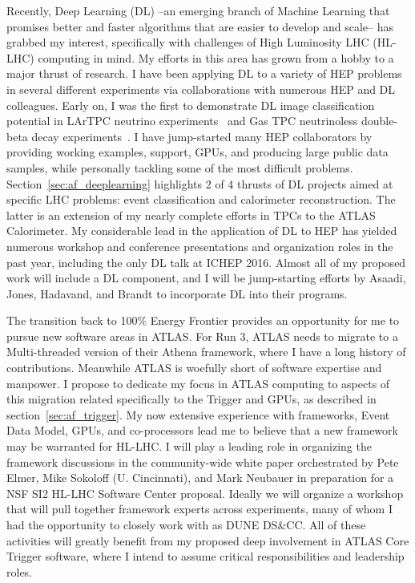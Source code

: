 Recently, Deep Learning (DL) --an emerging branch of Machine Learning
that promises better and faster algorithms that are easier to develop
and scale-- has grabbed my interest, specifically with challenges of
High Luminosity LHC (HL-LHC) computing in mind. My efforts in this
area has grown from a hobby to a major thrust of research. I have been
applying DL to a variety of HEP problems in several different
experiments via collaborations with numerous HEP and DL
colleagues. Early on, I was the first to demonstrate DL image
classification potential in LArTPC neutrino
experiments~\cite{AFFermilabSeminar} and Gas TPC neutrinoless
double-beta decay experiments~\cite{ICHEP2016DL}. I have jump-started
many HEP collaborators by providing working examples, support, GPUs,
and producing large public data samples, while personally tackling
some of the most difficult problems. Section~\ref{sec:af_deeplearning}
highlights 2 of 4 thrusts of DL projects aimed at specific LHC
problems: event classification and calorimeter reconstruction. The
latter is an extension of my nearly complete efforts in TPCs to the
ATLAS Calorimeter.  My considerable lead in the application of DL to
HEP has yielded numerous workshop and conference presentations and
organization roles in the past year\cite{DSAtLHC,WireCellWS,AFFermilabSeminar,
HeavyFlavorDL, ConnectingDotsDL,ATLASMLDL, HSFDL, SimonsDL, HarvardDL},
including the only DL talk at ICHEP 2016\cite{ICHEP2016DL}.  Almost
all of my proposed work will include a DL component, and I will be
jump-starting efforts by Asaadi, Jones, Hadavand, and Brandt to
incorporate DL into their programs.


The transition back to 100\% Energy Frontier provides an opportunity
for me to pursue new software areas in ATLAS. For Run 3, ATLAS needs
to migrate to a Multi-threaded version of their Athena framework,
where I have a long history of contributions. Meanwhile ATLAS is
woefully short of software expertise and manpower. I propose to
dedicate my focus in ATLAS computing to aspects of this migration
related specifically to the Trigger and GPUs, as described in
section~\ref{sec:af_trigger}. My now extensive experience with
frameworks, Event Data Model, GPUs, and co-processors lead me to
believe that a new framework may be warranted for HL-LHC.  I will play
a leading role in organizing the framework discussions in the
community-wide white paper orchestrated by Pete Elmer, Mike Sokoloff
(U. Cincinnati), and Mark Neubauer in preparation for a NSF SI2
HL-LHC Software Center proposal. Ideally we will organize a workshop
that will pull together framework experts across experiments, many of
whom I had the opportunity to closely work with as DUNE DS\&CC. All of
these activities will greatly benefit from my proposed deep
involvement in ATLAS Core Trigger software, where I intend to assume
critical responsibilities and leadership roles.

